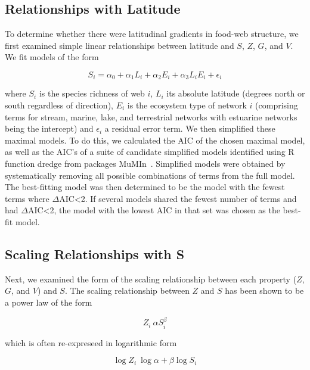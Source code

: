 \documentclass[12pt]{article}
\begin{document}
\subsection*{Relationships with Latitude}

To determine whether there were latitudinal gradients in food-web structure,
we first examined simple linear relationships between latitude and $S$, $Z$, $G$, and $V$. 
We fit models of the form

\begin{equation}
\label{Latfull}
S_{i} = \alpha_{0} + \alpha_{1} L_{i} + \alpha_{2} E_{i} + \alpha_{3} L_{i} E_{i} + \epsilon_{i} 
\end{equation}

where $S_{i}$ is the species richness of web $i$, $L_{i}$ its absolute
latitude (degrees north or south  regardless of direction), $E_{i}$ is the
ecosystem type of network $i$ (comprising terms for stream, marine, lake, and terrestrial networks with estuarine
networks being the intercept) and $\epsilon_{i}$ a residual error term. 
We then simplified these maximal models. To do this, we calculated the AIC
of the chosen maximal model, as well as the AIC's of a suite of candidate simplified models identified
using R~\citep{R} function dredge from packages MuMIn~\citep{MuMIn}. Simplified models were obtained by
systematically removing all possible combinations of terms from the full model.
The best-fitting model was then determined to be the model with the fewest terms 
where $\Delta$AIC\textless2. If several models shared the fewest number of terms 
and had $\Delta$AIC\textless2, the model with the lowest AIC in that set was chosen as the best-fit
model.


\subsection*{Scaling Relationships with S}

Next, we examined the form of the scaling relationship between each 
property ($Z$, $G$, and $V$) and $S$. The scaling relationship between $Z$ and 
$S$ has been shown to be a power law \citep{Riede2010} of the form 

\begin{equation}
\label{Power}
Z_{i}~\alpha S_{i}^{\beta}
\end{equation}

which is often re-expreseed in logarithmic form 

\begin{equation}
\label{Loglog}
\log{Z_{i}} ~ \log{\alpha} + \beta\log{S_{i}}
\end{equation}
\end{document}
